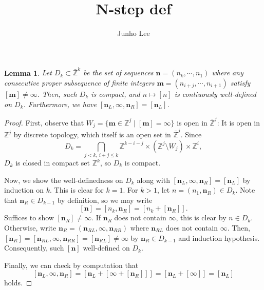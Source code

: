 \documentclass{article}
\title{N-step def}
\author{Junho Lee}
\theoremstyle{definition}
\theoremstyle{plain}
\newtheorem{lemma}{Lemma}[section]
\theoremstyle{remark}
\numberwithin{equation}{section}
\newcommand{\bZ}{\mathbb{Z}}
\begin{document}
\maketitle

\def\ms{\mathbf{m}}
\def\ns{\mathbf{n}}
\def\nsL{\mathbf{n}_L}
\def\nsR{\mathbf{n}_R}

\begin{lemma}
  Let $D_k \subset \bar{\bZ}^k$ be the set of sequences $\ns = (n_k, \cdots, n_1)$
  where any consecutive proper subsequence of finite integers $\ms = (n_{i+j}, \cdots, n_{i+1})$ satisfy $[\ms] \neq \infty$.
  Then, such $D_k$ is compact, and $n \mapsto [n]$ is contiuously well-defined on $D_k$.
  Furthermore, we have $[\nsL, \infty, \nsR] = [\nsL]$.
\end{lemma}
\begin{proof}
  First, observe that $W_j = \{ \ms \in \bZ^j \mid [\ms] = \infty \}$ is open in $\bar{\bZ}^j$:
  It is open in $\bZ^j$ by discrete topology, which itself is an open set in $\bar{\bZ}^j$.
  Since
  \[ D_k = \bigcap_{j < k, \, i + j \leq k} \bZ^{k-i-j} \times (\bZ^j \setminus W_j) \times \bZ^i, \]
  $D_k$ is closed in compact set $\bZ^k$, so $D_k$ is compact.

  Now, we show the well-definedness on $D_k$ along with $[\nsL, \infty, \nsR] = [\nsL]$ by induction on $k$.
  This is clear for $k = 1$.
  For $k > 1$, let $n = (n_1, \nsR) \in D_k$.
  Note that $\nsR \in D_{k-1}$ by definition, so we may write
  \[
    [\ns] = [n_k, \nsR] = [n_k + [\nsR]].
  \]
  Suffices to show $[\nsR] \neq \infty$.
  If $\nsR$ does not contain $\infty$, this is clear by $n \in D_k$.
  Otherwise, write $\nsR = (\mathbf{n}_{RL}, \infty, \mathbf{n}_{RR})$ where $\mathbf{n}_{RL}$ does not contain $\infty$.
  Then, $[\nsR] = [\mathbf{n}_{RL}, \infty, \mathbf{n}_{RR}] = [\mathbf{n}_{RL}] \neq \infty$
  by $\nsR \in D_{k-1}$ and induction hypothesis.
  Consequently, such $[\ns]$ well-defined on $D_k$.

  Finally, we can check by computation that
  \[
    [\nsL, \infty, \nsR] = [\nsL + [\infty + [\nsR]]] = [\nsL + [\infty]] = [\nsL]
  \]
  holds.
\end{proof}
\end{document}
